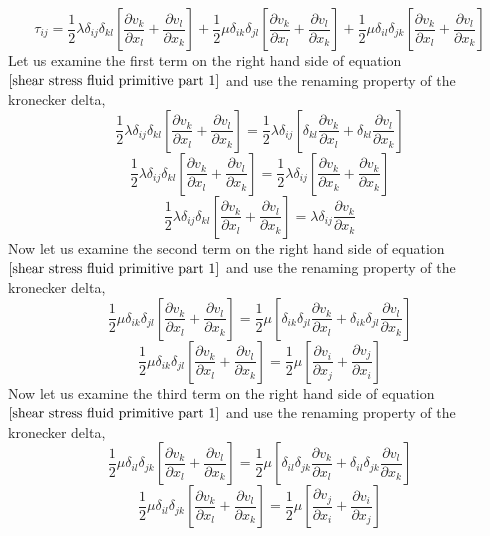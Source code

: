 \begin{equation}
\tau_{ij} = \frac{1}{2}\lambda \delta_{ij}\delta_{kl}\left[\frac{\partial v_{k}}{\partial x_{l}} + \frac{\partial v_{l}}{\partial x_{k}}\right]
 + \frac{1}{2}\mu\delta_{ik}\delta_{jl}\left[\frac{\partial v_{k}}{\partial x_{l}} + \frac{\partial v_{l}}{\partial x_{k}}\right]
 + \frac{1}{2}\mu\delta_{il}\delta_{jk}\left[\frac{\partial v_{k}}{\partial x_{l}} + \frac{\partial v_{l}}{\partial x_{k}}\right]
\label{shear stress fluid primitive part 1}
\end{equation}
Let us examine the first term on the right hand side of equation $\ref{shear stress fluid primitive part 1}$ and use the renaming property of the kronecker delta,
$$\frac{1}{2}\lambda \delta_{ij}\delta_{kl}\left[\frac{\partial v_{k}}{\partial x_{l}} + \frac{\partial v_{l}}{\partial x_{k}}\right] = \frac{1}{2}\lambda \delta_{ij}\left[\delta_{kl}\frac{\partial v_{k}}{\partial x_{l}} + \delta_{kl}\frac{\partial v_{l}}{\partial x_{k}}\right]$$
$$\frac{1}{2}\lambda \delta_{ij}\delta_{kl}\left[\frac{\partial v_{k}}{\partial x_{l}} + \frac{\partial v_{l}}{\partial x_{k}}\right] = \frac{1}{2}\lambda \delta_{ij}\left[\frac{\partial v_{k}}{\partial x_{k}} + \frac{\partial v_{k}}{\partial x_{k}}\right]$$
$$\frac{1}{2}\lambda \delta_{ij}\delta_{kl}\left[\frac{\partial v_{k}}{\partial x_{l}} + \frac{\partial v_{l}}{\partial x_{k}}\right] = \lambda \delta_{ij}\frac{\partial v_{k}}{\partial x_{k}}$$
Now let us examine the second term on the right hand side of equation $\ref{shear stress fluid primitive part 1}$ and use the renaming property of the kronecker delta,
$$\frac{1}{2}\mu\delta_{ik}\delta_{jl}\left[\frac{\partial v_{k}}{\partial x_{l}} + \frac{\partial v_{l}}{\partial x_{k}}\right] = \frac{1}{2}\mu\left[\delta_{ik}\delta_{jl}\frac{\partial v_{k}}{\partial x_{l}} + \delta_{ik}\delta_{jl}\frac{\partial v_{l}}{\partial x_{k}}\right]$$
$$\frac{1}{2}\mu\delta_{ik}\delta_{jl}\left[\frac{\partial v_{k}}{\partial x_{l}} + \frac{\partial v_{l}}{\partial x_{k}}\right] = \frac{1}{2}\mu\left[\frac{\partial v_{i}}{\partial x_{j}} + \frac{\partial v_{j}}{\partial x_{i}}\right]$$
Now let us examine the third term on the right hand side of equation $\ref{shear stress fluid primitive part 1}$ and use the renaming property of the kronecker delta,
$$\frac{1}{2}\mu\delta_{il}\delta_{jk}\left[\frac{\partial v_{k}}{\partial x_{l}} + \frac{\partial v_{l}}{\partial x_{k}}\right] = \frac{1}{2}\mu\left[\delta_{il}\delta_{jk}\frac{\partial v_{k}}{\partial x_{l}} + \delta_{il}\delta_{jk}\frac{\partial v_{l}}{\partial x_{k}}\right]$$
$$\frac{1}{2}\mu\delta_{il}\delta_{jk}\left[\frac{\partial v_{k}}{\partial x_{l}} + \frac{\partial v_{l}}{\partial x_{k}}\right] = \frac{1}{2}\mu\left[\frac{\partial v_{j}}{\partial x_{i}} + \frac{\partial v_{i}}{\partial x_{j}}\right]$$
